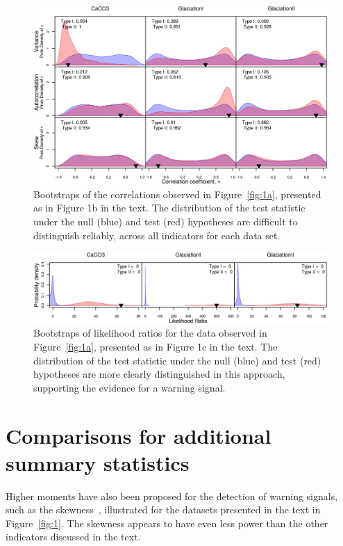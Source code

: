 \documentclass[authoryear, preprint,review,12pt]{elsarticle}
\begin{document}
\begin{figure}
\begin{center}
\includegraphics{appendix_fig2}
\end{center}
\caption{Bootstraps of the correlations observed in Figure~\ref{fig:1a}, presented as in Figure 1b in the text.  The distribution of the test statistic under the null (blue) and test (red) hypotheses are difficult to distinguish reliably, across all indicators for each data set.}
\label{fig:1b}
\end{figure}


\begin{figure}
\begin{center}
\includegraphics{appendix_fig3}
\end{center}
\caption{Bootstraps of likelihood ratios for the data observed in Figure~\ref{fig:1a}, presented as in Figure 1c in the text.  The distribution of the test statistic under the null (blue) and test (red) hypotheses are more clearly distinguished in this approach, supporting the evidence for a warning signal.}
\label{fig:1c}
\end{figure}


\section{Comparisons for additional summary statistics}
Higher moments have also been proposed for the detection of warning signals, such as the skewness~\citep{Guttal2008a}, illustrated for the datasets presented in the text in Figure~\ref{fig:1}.  The skewness appears to have even less power than the other indicators discussed in the text.  
\end{document}
